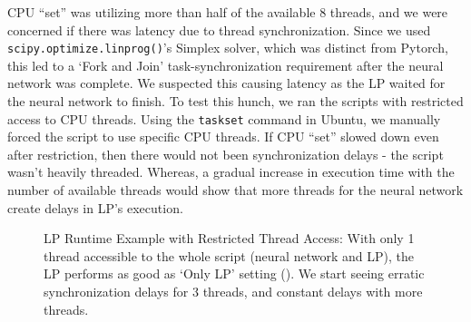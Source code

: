 \begin{appendices}
    CPU ``set'' was utilizing more than half of the available 8 threads, and we were concerned if there was latency due to thread synchronization. Since we used \texttt{scipy.optimize.linprog()}'s Simplex solver, which was distinct from Pytorch, this led to a `Fork and Join' task-synchronization requirement \cite[Section 2.2]{IssuesMP} after the neural network was complete. We suspected this causing latency as the LP waited for the neural network to finish. To test this hunch, we ran the scripts with restricted access to CPU threads. Using the \texttt{taskset} command in Ubuntu, we manually forced the script to use specific CPU threads. If CPU ``set'' slowed down even after restriction, then there would not been synchronization delays - the script wasn't heavily threaded. Whereas, a gradual increase in execution time with the number of available threads would show that more threads for the neural network create delays in LP's execution.
    \begin{figure}[!htbp]
        \centering
        \caption[LP Runtime Example with Restricted Thread Access]{LP Runtime Example with Restricted Thread Access: With only 1 thread accessible to the whole script (neural network and LP), the LP performs as good as `Only LP' setting (). We start seeing erratic synchronization delays for 3 threads, and constant delays with more threads.}
        \label{fig:LP Runtime Example with Restricted Thread Access}
    \end{figure}
    

\end{appendices}
